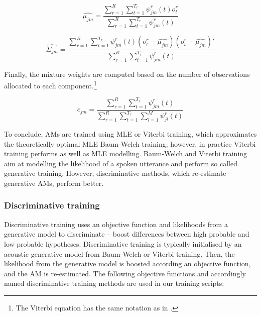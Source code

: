 \begin{equation}\label{eq:mean}
  \hat{\mu_{jm}} = \frac{\sum_{r=1}^{R}{\sum_{t=1}^{T_r}{\psi^r_{jm}(t)o^r_t}}}  {\sum_{r=1}^{R}{\sum_{t=1}^{T_r}{\psi^r_{jm}(t)}}}
\end{equation}

\begin{equation}\label{eq:var}
  \hat{\Sigma_{jm}} = \frac{\sum_{r=1}^{R}{\sum_{t=1}^{T_r}{\psi^r_{jm}(t)(o^r_t - \hat{\mu_{jm}})(o^r_t - \hat{\mu_{jm}})'}}}  {\sum_{r=1}^{R}{\sum_{t=1}^{T_r}{\psi^r_{jm}(t)}}}
\end{equation}

Finally, the mixture weights are computed based on the number of observations allocated to each component.\footnote{The Viterbi equation has the same notation as in \cite{buthpitiya2012parallel}.}

\begin{equation}\label{eq:weights}
  c_{jm} = \frac{\sum_{r=1}^{R}{\sum_{t=1}^{T_r}{\psi^r_{jm}(t)}}} {\sum_{r=1}^{R}{\sum_{t=1}^{T_r}\sum_{l=1}^{M}{\psi^r_{jl}(t)}}}
\end{equation}

To conclude, \ac{AM}s are trained using \ac{MLE} or Viterbi training, which approximates the theoretically optimal \ac{MLE} Baum-Welch training; however, in practice Viterbi training performs as well as \ac{MLE} modelling. Baum-Welch and Viterbi training aim at modelling the likelihood of a spoken utterance and perform so called generative training. However, discriminative methods, which re-estimate generative \acp{AM}, perform better.

\subsubsection*{Discriminative training}
\label{sub:subsection_name}


Discriminative training uses an objective function and likelihoods from a generative model to discriminate -- boost differences between high probable and low probable hypotheses. Discriminative training is typically initialised by an acoustic generative model from Baum-Welch or Viterbi training. Then, the likelihood from the generative model is boosted according an objective function, and the \ac{AM} is re-estimated. The following objective functions and accordingly named discriminative training methods are used in our training scripts:

